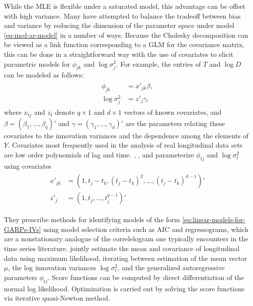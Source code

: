 \bigskip

While the MLE is flexible under a saturated model, this advantage can be offset with high variance. Many have attempted to balance the tradeoff between bias and variance by reducing the dimension of the parameter space under model \eqref{eq:mcd-ar-model} in a number of ways. Because the Cholesky decomposition can be viewed as a link function corresponding to a GLM for the covariance matrix, this can be done in a straightforward way with the use of covariates to  elicit parametric models for $\phi_{jk}$ and $\log\sigma_j^2$.  For example, the entries of $T$ and $\log D$ can be modeled as follows:
\begin{align}
\begin{split} \label{eq:linear-models-for-GARPs-IVs}
\phi_{jk} &= x'_{jk} \beta,\\
\log\sigma_j^2 &= z'_j \gamma,
\end{split}
\end{align}
\noindent
where $x_{tj}$ and $z_{t}$ denote $q \times 1$ and $d \times 1$ vectors of known covariates, and $\beta = \left(\beta_1,\dots, \beta_q \right)'$ and $\gamma = \left(\gamma_1,\dots, \gamma_d \right)'$ are the parameters relating these covariates to the innovation variances and the dependence among the elements of $Y$. Covariates most frequently used in the analysis of real longitudinal data sets are low order polynomials of lag and time. \cite{pourahmadi1999joint}, \cite{pourahmadi2000maximum}, and \cite{pan2003modelling} parameterize $\phi_{tj}$ and $\log \sigma^2_t$ using covariates
\begin{align}
\begin{split}  \label{eq:GARP-IV-parametric-model}
x'_{jk} &= \left(1, t_j - t_k, \left(t_j - t_k\right)^2,\dots, \left(t_j - t_k\right)^{d-1}\right)' \\
z'_{j}  &= \left(1, t_j, \dots, t_j^{q-1}\right)'
\end{split}
\end{align}

They prescribe methods for identifying models of the form \eqref{eq:linear-models-for-GARPs-IVs} using model selection criteria such as AIC and regressograms, which are a nonstationary analogue of the correlelogram one typically encounters in the time series literature. \cite{pan2003modelling} jointly estimate the mean and covariance of longitudinal data using maximum likelihood, iterating between estimation of the mean vector $\mu$, the log innovation variances $\log \sigma_{t}^2$, and the generalized autoregressive parameters $\phi_{tj}$. Score functions can be computed by direct differentiation of the normal log likelihood. Optimization is carried out by solving the score functions via iterative quasi-Newton method. 

